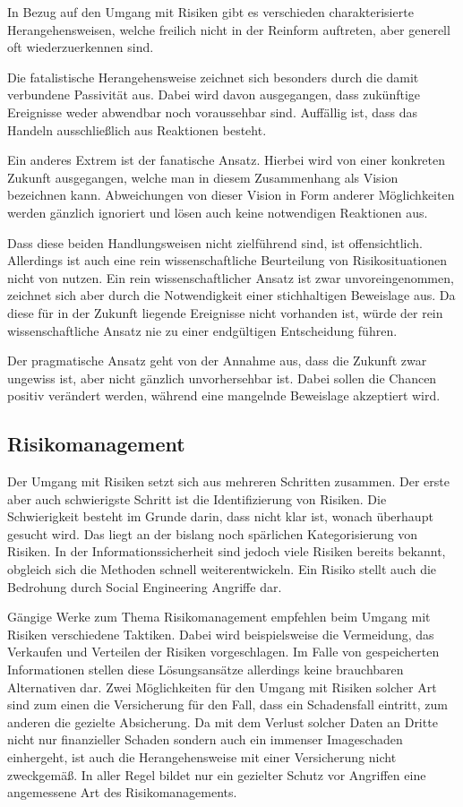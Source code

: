 In Bezug auf den Umgang mit Risiken gibt es verschieden charakterisierte Herangehensweisen, welche
freilich nicht in der Reinform auftreten, aber generell oft wiederzuerkennen sind.

Die fatalistische Herangehensweise zeichnet sich besonders durch die damit verbundene Passivität aus.
Dabei wird davon ausgegangen, dass zukünftige Ereignisse weder abwendbar noch voraussehbar sind.
Auffällig ist, dass das Handeln ausschließlich aus Reaktionen besteht.

Ein anderes Extrem ist der fanatische Ansatz. Hierbei wird von einer konkreten Zukunft ausgegangen,
welche man in diesem Zusammenhang als Vision bezeichnen kann.
Abweichungen von dieser Vision in Form anderer Möglichkeiten werden gänzlich ignoriert und lösen auch
keine notwendigen Reaktionen aus.

Dass diese beiden Handlungsweisen nicht zielführend sind, ist offensichtlich.
Allerdings ist auch eine rein wissenschaftliche Beurteilung von Risikosituationen nicht von nutzen.
Ein rein wissenschaftlicher Ansatz ist zwar unvoreingenommen, zeichnet sich aber durch die
Notwendigkeit einer stichhaltigen Beweislage aus.
Da diese für in der Zukunft liegende Ereignisse nicht vorhanden ist, würde der rein wissenschaftliche
Ansatz nie zu einer endgültigen Entscheidung führen.

Der pragmatische Ansatz geht von der Annahme aus, dass die Zukunft zwar ungewiss ist, aber nicht
gänzlich unvorhersehbar ist.
Dabei sollen die Chancen positiv verändert werden, während eine mangelnde Beweislage akzeptiert wird.
\citep{risikomanagement}

\subsection{Risikomanagement}\label{sec:risikomanagement}
Der Umgang mit Risiken setzt sich aus mehreren Schritten zusammen.
Der erste aber auch schwierigste Schritt ist die Identifizierung von Risiken.
Die Schwierigkeit besteht im Grunde darin, dass nicht klar ist, wonach überhaupt gesucht wird.
Das liegt an der bislang noch spärlichen Kategorisierung von Risiken.
In der Informationssicherheit sind jedoch viele Risiken bereits bekannt, obgleich sich die Methoden
schnell weiterentwickeln.
Ein Risiko stellt auch die Bedrohung durch Social Engineering Angriffe dar.

Gängige Werke zum Thema Risikomanagement empfehlen beim Umgang mit Risiken verschiedene Taktiken.
Dabei wird beispielsweise die Vermeidung, das Verkaufen und Verteilen der Risiken vorgeschlagen.
Im Falle von gespeicherten Informationen stellen diese Lösungsansätze allerdings keine brauchbaren
Alternativen dar.
Zwei Möglichkeiten für den Umgang mit Risiken solcher Art sind zum einen die Versicherung für den
Fall, dass ein Schadensfall eintritt, zum anderen die gezielte Absicherung.
Da mit dem Verlust solcher Daten an Dritte nicht nur finanzieller Schaden sondern auch ein immenser
Imageschaden einhergeht, ist auch die Herangehensweise mit einer Versicherung nicht zweckgemäß.
In aller Regel bildet nur ein gezielter Schutz vor Angriffen eine angemessene Art des
Risikomanagements.

